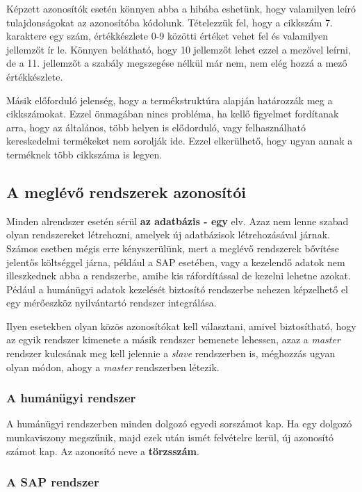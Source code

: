 \documentclass[a4paper,12pt]{report}
\begin{document}
Képzett azonosítók esetén könnyen abba a hibába eshetünk, hogy valamilyen leíró
tulajdonságokat az azonosítóba kódolunk. Tételezzük fel, hogy a cikkszám 7.
karaktere egy szám, értékkészlete 0-9 közötti értéket vehet fel és valamilyen 
jellemzőt ír le. Könnyen belátható, hogy 10 jellemzőt lehet ezzel a mezővel 
leírni, de a 11. jellemzőt a szabály megszegése nélkül már nem, nem elég hozzá a 
mező értékkészlete.

Másik előforduló jelenség, hogy a termékstruktúra alapján határozzák meg a 
cikkszámokat. Ezzel önmagában nincs probléma, ha kellő figyelmet fordítanak 
arra, hogy az általános, több helyen is elődorduló, vagy felhasználható 
kereskedelmi termékeket nem sorolják ide. Ezzel elkerülhető, hogy ugyan annak a 
terméknek több cikkszáma is legyen.

\subsection{A meglévő rendszerek azonosítói}

Minden alrendszer esetén sérül \textbf{az adatbázis - egy} elv. Azaz nem lenne 
szabad olyan rendszereket létrehozni, amelyek új adatbázisok létrehozásával 
járnak. Számos esetben mégis erre kényszerülünk, mert a meglévő rendszerek 
bővítése jelentős költséggel járna, például a SAP esetében, vagy a kezelendő 
adatok nem illeszkednek abba a rendszerbe, amibe kis ráfordítással de kezelni 
lehetne azokat. Pédául a humánügyi adatok kezelését biztosító rendszerbe 
nehezen képzelhető el egy mérőeszköz nyilvántartó rendszer integrálása.

Ilyen esetekben olyan közös azonosítókat kell választani, amivel biztosítható,
hogy az egyik rendszer kimenete a másik rendszer bemenete lehessen, azaz a 
\textit{master} rendszer kulcsának meg kell jelennie a \textit{slave} 
rendszerben is, méghozzás ugyan olyan módon, ahogy a \textit{master} 
rendszerben létezik.

\subsubsection{A humánügyi rendszer}
A humánügyi rendszerben minden dolgozó egyedi sorszámot kap. Ha egy dolgozó 
munkaviszony megszűnik, majd ezek után ismét felvételre kerül, új azonosító 
számot kap. Az azonosító neve a \textbf{törzsszám}.

\subsubsection{A SAP rendszer}
\end{document}
